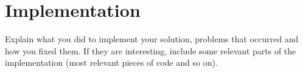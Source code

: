 \chapter{Implementation}

Explain what you did to implement your solution, problems that occurred and how you fixed them. 
If they are interesting, include some relevant parts of the implementation (most relevant pieces of code and so on). 
